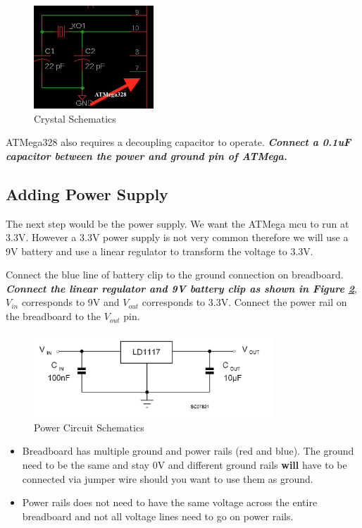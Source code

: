 \documentclass{article}
\begin{document}
\begin{figure}[!h]
    \center
    \includegraphics[width=0.4\textwidth,keepaspectratio]{crystal}
    \caption{Crystal Schematics}
    \label{img:crystal}
\end{figure}

ATMega328 also requires a decoupling capacitor to operate. \textbf{\emph{Connect a 0.1uF capacitor between the power and ground pin of ATMega.}}

\subsection{Adding Power Supply}
The next step would be the power supply. We want the ATMega mcu to run at 3.3V. However a 3.3V power supply is not very common therefore we will use a 9V battery and use a linear regulator to transform the voltage to 3.3V. \par
Connect the blue line of battery clip to the ground connection on breadboard. \emph{\textbf{Connect the linear regulator and 9V battery clip as shown in Figure \ref{img:linear_regulator}}}, $V_{in}$ corresponds to 9V and $V_{out}$ corresponds to 3.3V. Connect the power rail on the breadboard to the $V_{out}$ pin. 

\begin{figure}[!h]
    \center
    \includegraphics[width=0.8\textwidth,keepaspectratio]{linear_regulator}
    \caption{Power Circuit Schematics}
    \label{img:linear_regulator}
\end{figure}

\begin{tcolorbox} [title=Tips \& Tricks]
    \begin{itemize}
        \item Breadboard has multiple ground and power rails (red and blue). The ground need to be the same and stay 0V and different ground rails \textbf{will} have to be connected via jumper wire should you want to use them as ground.
        \item Power rails does not need to have the same voltage across the entire breadboard and not all voltage lines need to go on power rails. 
    \end{itemize}
\end{tcolorbox}
\end{document}
